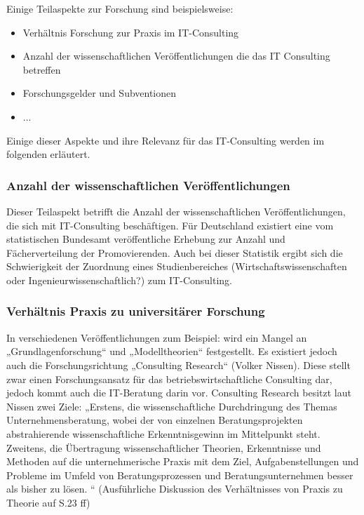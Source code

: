 Einige Teilaspekte zur Forschung sind beispielsweise:
\begin{itemize}
\item Verhältnis Forschung zur Praxis im IT-Consulting
\item Anzahl der wissenschaftlichen Veröffentlichungen die das IT Consulting betreffen
\item Forschungsgelder und Subventionen
\item ...
\end{itemize}

Einige dieser Aspekte und ihre Relevanz für das IT-Consulting werden im folgenden erläutert.

\subsubsection*{Anzahl der wissenschaftlichen Veröffentlichungen}
Dieser Teilaspekt betrifft die Anzahl der wissenschaftlichen Veröffentlichungen, die sich mit IT-Consulting beschäftigen. 
Für Deutschland existiert eine vom statistischen Bundesamt veröffentliche Erhebung zur Anzahl und Fächerverteilung der Promovierenden.\cite{destatis}
Auch bei dieser Statistik ergibt sich die Schwierigkeit der Zuordnung eines Studienbereiches (Wirtschaftswissenschaften oder Ingenieurwissenschaftlich?) zum IT-Consulting. 

\subsubsection*{Verhältnis Praxis zu universitärer Forschung}
In verschiedenen Veröffentlichungen zum Beispiel: \cite[1]{IDSScheer} wird ein Mangel an „Grundlagenforschung“ und „Modelltheorien“ festgestellt. Es existiert jedoch auch die Forschungsrichtung „Consulting Research“ (Volker Nissen). Diese stellt zwar einen Forschungsansatz für das betriebswirtschaftliche Consulting dar, jedoch kommt auch die IT-Beratung darin vor. Consulting Research besitzt laut Nissen zwei Ziele: „Erstens, die wissenschaftliche Durchdringung des Themas Unternehmensberatung, wobei der von einzelnen Beratungsprojekten abstrahierende wissenschaftliche Erkenntnisgewinn im Mittelpunkt steht. Zweitens, die Übertragung wissenschaftlicher Theorien, Erkenntnisse und Methoden auf die unternehmerische Praxis mit dem Ziel, Aufgabenstellungen und Probleme im Umfeld von Beratungsprozessen und Beratungsunternehmen besser als bisher zu lösen. “
(Ausführliche Diskussion des Verhältnisses von Praxis zu Theorie auf S.23 ff)

